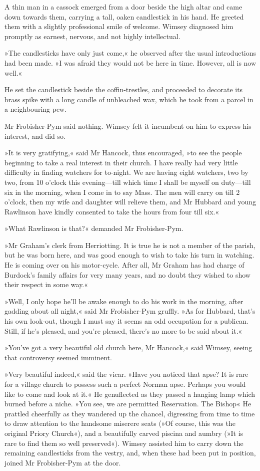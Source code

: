A thin man in a cassock emerged from a door beside the high altar and came down towards them, carrying a tall, oaken candlestick in his hand. He greeted them with a slightly professional smile of welcome. Wimsey diagnosed him promptly as earnest, nervous, and not highly intellectual.

»The candlesticks have only just come,« he observed after the usual introductions had been made. »I was afraid they would not be here in time. However, all is now well.«

He set the candlestick beside the coffin-trestles, and proceeded to decorate its brass spike with a long candle of unbleached wax, which he took from a parcel in a neighbouring pew.

Mr Frobisher-Pym said nothing. Wimsey felt it incumbent on him to express his interest, and did so.

»It is very gratifying,« said Mr Hancock, thus encouraged, »to see the people beginning to take a real interest in their church. I have really had very little difficulty in finding watchers for to-night. We are having eight watchers, two by two, from 10 o'clock this evening—till which time I shall be myself on duty—till six in the morning, when I come in to say Mass. The men will carry on till 2 o'clock, then my wife and daughter will relieve them, and Mr Hubbard and young Rawlinson have kindly consented to take the hours from four till six.«

»What Rawlinson is that?« demanded Mr Frobisher-Pym.

»Mr Graham's clerk from Herriotting. It is true he is not a member of the parish, but he was born here, and was good enough to wish to take his turn in watching. He is coming over on his motor-cycle. After all, Mr Graham has had charge of Burdock's family affairs for very many years, and no doubt they wished to show their respect in some way.«

»Well, I only hope he'll be awake enough to do his work in the morning, after gadding about all night,« said Mr Frobisher-Pym gruffly. »As for Hubbard, that's his own look-out, though I must say it seems an odd occupation for a publican. Still, if he's pleased, and you're pleased, there's no more to be said about it.«

»You've got a very beautiful old church here, Mr Hancock,« said Wimsey, seeing that controversy seemed imminent.

»Very beautiful indeed,« said the vicar. »Have you noticed that apse? It is rare for a village church to possess such a perfect Norman apse. Perhaps you would like to come and look at it.« He genuflected as they passed a hanging lamp which burned before a niche. »You see, we are permitted Reservation. The Bishop\longdash« He prattled cheerfully as they wandered up the chancel, digressing from time to time to draw attention to the handsome miserere seats (»Of course, this was the original Priory Church«), and a beautifully carved piscina and aumbry (»It is rare to find them so well preserved«). Wimsey assisted him to carry down the remaining candlesticks from the vestry, and, when these had been put in position, joined Mr Frobisher-Pym at the door.

